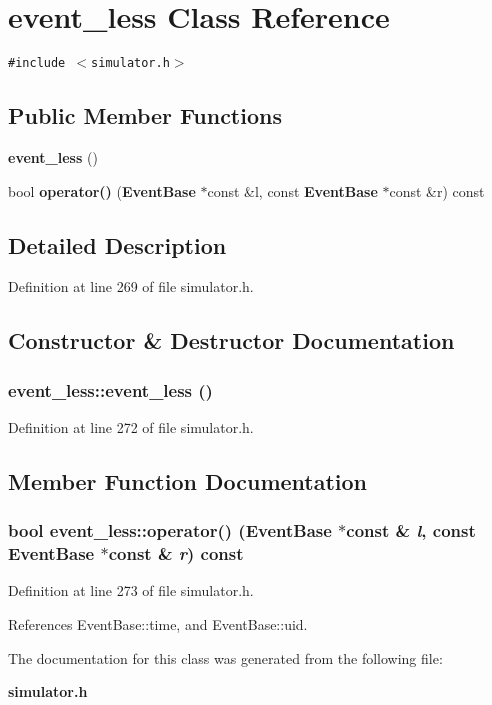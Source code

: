 \section{event\_\-less Class Reference}
\label{classevent__less}
{\tt \#include $<$simulator.h$>$}

\subsection*{Public Member Functions}
\begin{CompactItemize}
\item 
{\bf event\_\-less} ()
\item 
bool {\bf operator()} ({\bf EventBase} $\ast$const \&l, const {\bf EventBase} $\ast$const \&r) const 
\end{CompactItemize}


\subsection{Detailed Description}


Definition at line 269 of file simulator.h.

\subsection{Constructor \& Destructor Documentation}
\subsubsection[{event\_\-less}]{\setlength{\rightskip}{0pt plus 5cm}event\_\-less::event\_\-less ()\hspace{0.3cm}{\tt  [inline]}}\label{classevent__less_b721525a6ed5ec4551920178ea91726c}




Definition at line 272 of file simulator.h.

\subsection{Member Function Documentation}
\subsubsection[{operator()}]{\setlength{\rightskip}{0pt plus 5cm}bool event\_\-less::operator() ({\bf EventBase} $\ast$const \& {\em l}, \/  const {\bf EventBase} $\ast$const \& {\em r}) const\hspace{0.3cm}{\tt  [inline]}}\label{classevent__less_280b704ba9909d43362de372d0a45523}




Definition at line 273 of file simulator.h.

References EventBase::time, and EventBase::uid.

The documentation for this class was generated from the following file:\begin{CompactItemize}
\item 
{\bf simulator.h}\end{CompactItemize}
